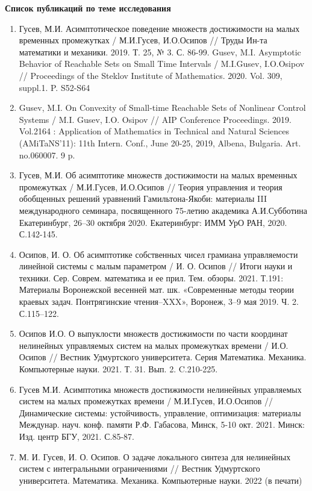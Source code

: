\documentclass[../main.tex]{subfiles}
\begin{document}
   \textbf{\Large{Список публикаций по теме исследования}}
\begin{enumerate}
	\item Гусев, М.И. Асимптотическое поведение множеств достижимости на малых временных промежутках / М.И.Гусев, И.О.Осипов // Труды Ин-та математики и механики. 2019. Т. 25, № 3. С. 86-99. Gusev, M.I. Asymptotic Behavior of Reachable Sets on Small Time Intervals / M.I.Gusev, I.O.Osipov // Proceedings of the Steklov Institute of Mathematics. 2020. Vol. 309, suppl.1. P. S52-S64
	\item Gusev, M.I. On Convexity of Small-time Reachable Sets of Nonlinear Control Systems / M.I. Gusev, I.O. Osipov // AIP Conference Proceedings. 2019. Vol.2164 : Application of Mathematics in Technical and Natural Sciences (AMiTaNS’11): 11th Intern. Conf., June 20-25, 2019, Albena, Bulgaria. Art. no.060007. 9 p.
	\item Гусев, М.И. Об асимптотике множеств достижимости на малых временных промежутках / М.И.Гусев, И.О.Осипов // Теория управления и теория обобщенных решений уравнений Гамильтона-Якоби: материалы III международного семинара, посвященного 75-летию академика А.И.Субботина Екатеринбург, 26–30 октября 2020. Екатеринбург: ИММ УрО РАН, 2020. С.142-145.
	\item Осипов, И. О. Об асимптотике собственных чисел грамиана управляемости линейной системы с малым параметром / И. О. Осипов // Итоги науки и техники. Сер. Соврем. математика и ее прил. Тем. обзоры. 2021. Т.191: Материалы Воронежской весенней мат. шк. «Современные методы теории краевых задач. Понтрягинские чтения–XXX», Воронеж, 3–9 мая 2019. Ч. 2. С.115–122.
	\item Осипов И.О. О выпуклости множеств достижимости по части координат нелинейных управляемых систем на малых промежутках времени / И.О. Осипов // Вестник Удмуртского университета. Серия Математика. Механика. Компьютерные науки. 2021. Т. 31. Вып. 2. C.210-225.
	\item Гусев М.И. Асимптотика множеств достижимости нелинейных управляемых систем на малых промежутках времени / М.И.Гусев, И.О.Осипов // Динамические системы: устойчивость, управление, оптимизация: материалы Междунар. науч. конф. памяти Р.Ф. Габасова, Минск, 5-10 окт. 2021. Минск: Изд. центр БГУ, 2021. С.85-87. 
	\item М. И. Гусев, И. О. Осипов. О задаче локального синтеза для нелинейных систем с интегральными ограничениями // Вестник Удмуртского университета. Математика. Механика. Компьютерные науки. 2022 (в печати)
\end{enumerate}
\end{document}
